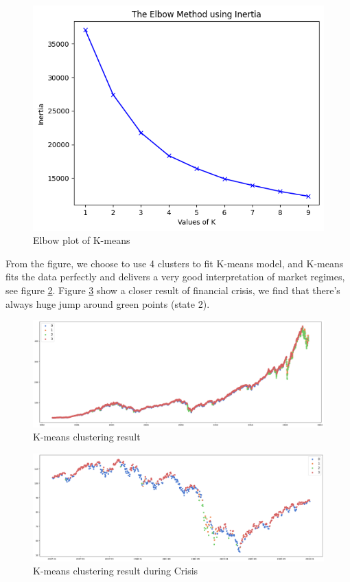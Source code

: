\documentclass[a4paper,12pt]{article}
\begin{document}
\begin{figure}[H]
    \centering
    \includegraphics[scale=0.6]{k_clusters.png}
    \caption{Elbow plot of K-means}\label{k_clusters}
\end{figure}

From the figure, we choose to use 4 clusters to fit K-means model, and K-means fits the data perfectly and delivers a very good interpretation of market regimes, see figure \ref{kmeans_all}. Figure \ref{kmeans_2008} show a closer result of financial crisis, we find that there's always huge jump around green points (state 2).

\begin{figure}[H]
    \includegraphics[scale=0.3]{kmeans_all.png}
    \caption{K-means clustering result}\label{kmeans_all}
\end{figure}

\begin{figure}[H]
    \includegraphics[scale=0.3]{kmeans_2008.png}
    \caption{K-means clustering result during Crisis}\label{kmeans_2008}
\end{figure}
\end{document}

